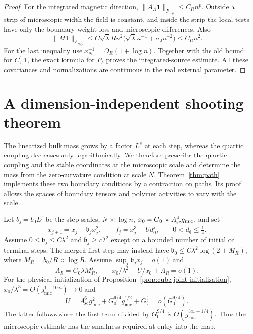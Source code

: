 \documentclass[11pt]{article}
\theoremstyle{definition}
\newcommand{\one}{\mathbf 1}
\begin{document}
\begin{proof}
For the integrated magnetic direction,
\(\|A_\Lambda\one\|_{F_{n,p}}\le C_R n^p\). Outside a strip of
microscopic width the field is constant, and inside the strip
the local tests have only the boundary weight loss and
microscopic differences. Also
\begin{equation}
 \|M\one\|_{F_{n,p}}
 \le C\sqrt{\lambda}R n^2
               \bigl(\sqrt\lambda n^{-1}+\sigma_0 n^{-2}\bigr)
 \le C_R n^2 .
\end{equation}
For the last inequality use \(x_N^{-1}=O_R(1+\log n)\).
Together with the old bound for \(C_<^0\one\), the exact formula
for \(P_\delta\) proves the integrated-source estimate.
All these covariances and normalizations are continuous
in the real external parameter.
\end{proof}

\section{A dimension-independent shooting theorem}\label{sec:path}

The linearized bulk mass grows by a factor \(L^s\) at each step, whereas the
quartic coupling decreases only logarithmically. We therefore prescribe
the quartic coupling and the stable coordinates at the microscopic
scale and determine the mass from the zero-curvature condition at
scale \(N\). Theorem~\ref{thm:path} implements these two boundary
conditions by a contraction on paths. Its proof allows the spaces
of boundary tensors and polymer activities to vary with the scale.

Let \(b_j=b_0 L^j\) be the step scales, \(N\asymp \log n\),
\(x_0=G_0\asymp A_{\rm sc}^4 g_{\mathrm{mic}}\), and set
\begin{equation}
 x_{j+1}=x_j-\mathfrak b_jx_j^2,\qquad f_j=x_j^3+U d_0^j,
\qquad 0<d_0\le\tfrac14 .
\end{equation}
Assume \(0\le\mathfrak b_j\le C\lambda^2\) and
\(\mathfrak b_j\ge c\lambda^2\) except on a bounded number of
initial or terminal steps. The merged first step may instead have
\(\mathfrak b_0\le C\lambda^2\log(2+M_R)\), where
\(M_R=b_0/R\asymp\log R\). Assume
\(\sup_j \mathfrak b_jx_j=o(1)\) and
\begin{equation}
 \Lambda_R=C_0\lambda M_R^s,\qquad
 x_0/\lambda^2+U/x_0+\Lambda_R=o(1).
\end{equation}
For the physical initialization of
Proposition~\ref{prop:cube-joint-initialization},
\(x_0/\lambda^3=O(g_{\mathrm{mic}}^{1-10a_*})\to0\) and
\begin{equation}
 U=A_{\mathrm{sc}}^6 g_{\mathrm{mic}}^2+
        G_0^{9/4}g_{\mathrm{mic}}^{1/2}+G_0^3
       =o(G_0^{9/4}) .
\end{equation}
The latter follows since the first term divided by \(G_0^{9/4}\)
is \(O(g_{\mathrm{mic}}^{3a_*-1/4})\).
Thus the microscopic estimate has the smallness required at entry into
the map.
\end{document}
